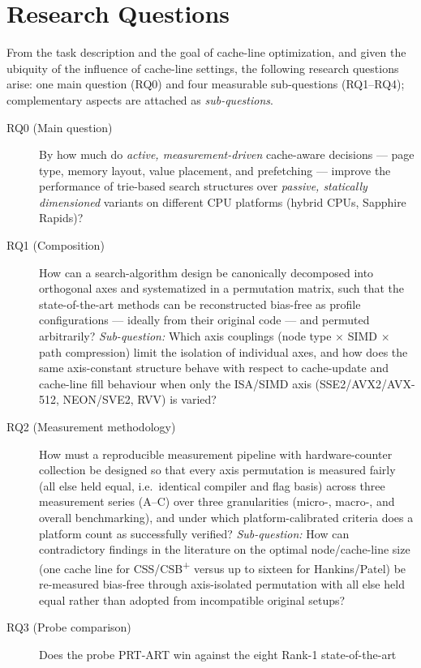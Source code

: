 \section{Research Questions}\label{sec:rqs}
From the task description and the goal of cache-line optimization, and given the ubiquity of the
influence of cache-line settings, the following research questions arise: one main question (RQ0)
and four measurable sub-questions (RQ1--RQ4); complementary aspects are attached as
\emph{sub-questions}.
\begin{description}
  \item[RQ0 (Main question)] By how much do \emph{active, measurement-driven} cache-aware decisions
  --- page type, memory layout, value placement, and prefetching --- improve the performance of
  trie-based search structures over \emph{passive, statically dimensioned} variants on different CPU
  platforms (hybrid CPUs, Sapphire Rapids)?
  \item[RQ1 (Composition)] How can a search-algorithm design be canonically decomposed into
  orthogonal axes and systematized in a permutation matrix, such that the state-of-the-art methods
  can be reconstructed bias-free as profile configurations --- ideally from their original code ---
  and permuted arbitrarily? \emph{Sub-question:} Which axis couplings (node type $\times$ SIMD
  $\times$ path compression) limit the isolation of individual axes, and how does the same
  axis-constant structure behave with respect to cache-update and cache-line fill behaviour when
  only the ISA/SIMD axis (SSE2/AVX2/AVX-512, NEON/SVE2, RVV) is varied?
  \item[RQ2 (Measurement methodology)] How must a reproducible measurement pipeline with
  hardware-counter collection be designed so that every axis permutation is measured fairly (all
  else held equal, i.e.\ identical compiler and flag basis) across three measurement series (A--C)
  over three granularities (micro-, macro-, and overall benchmarking), and under which
  platform-calibrated criteria does a platform count as successfully verified? \emph{Sub-question:}
  How can contradictory findings in the literature on the optimal node/cache-line size (one cache
  line for CSS/CSB\textsuperscript{+} versus up to sixteen for Hankins/Patel) be re-measured
  bias-free through axis-isolated permutation with all else held equal rather than adopted from
  incompatible original setups?
  \item[RQ3 (Probe comparison)] Does the probe PRT-ART win against the eight Rank-1 state-of-the-art

\end{description}
